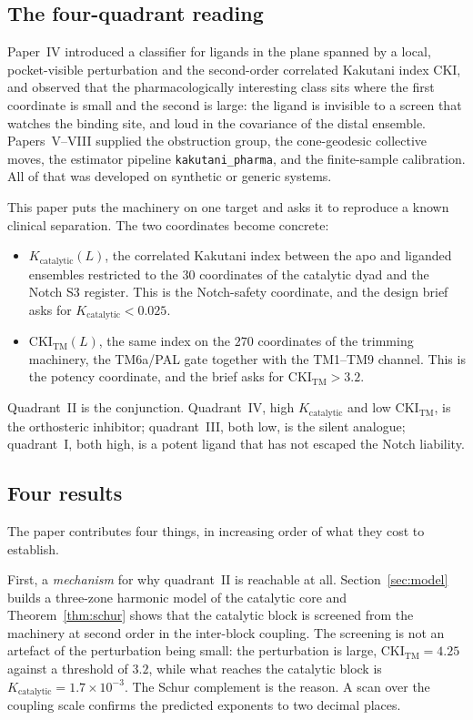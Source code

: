 \documentclass[11pt,reqno]{amsart}
\theoremstyle{plain}
\theoremstyle{definition}
\theoremstyle{remark}
\numberwithin{equation}{section}
\newcommand{\CKI}{\mathrm{CKI}}
\newcommand{\Kcat}{K_{\mathrm{catalytic}}}
\newcommand{\CKItm}{\CKI_{\mathrm{TM}}}
\newcommand{\pkg}{\texttt{kakutani\_pharma}}
\begin{document}
\subsection{The four-quadrant reading}
Paper~IV introduced a classifier for ligands in the plane spanned by a local, pocket-visible perturbation and the second-order correlated Kakutani index $\CKI$, and observed that the pharmacologically interesting class sits where the first coordinate is small and the second is large: the ligand is invisible to a screen that watches the binding site, and loud in the covariance of the distal ensemble. Papers~V--VIII supplied the obstruction group, the cone-geodesic collective moves, the estimator pipeline \pkg{}, and the finite-sample calibration. All of that was developed on synthetic or generic systems.

This paper puts the machinery on one target and asks it to reproduce a known clinical separation. The two coordinates become concrete:
\begin{itemize}[leftmargin=1.6em,itemsep=2pt]
\item $\Kcat(L)$, the correlated Kakutani index between the apo and liganded ensembles restricted to the $30$ coordinates of the catalytic dyad and the Notch S3 register. This is the Notch-safety coordinate, and the design brief asks for $\Kcat<0.025$.
\item $\CKItm(L)$, the same index on the $270$ coordinates of the trimming machinery, the TM6a/PAL gate together with the TM1--TM9 channel. This is the potency coordinate, and the brief asks for $\CKItm>3.2$.
\end{itemize}
Quadrant~II is the conjunction. Quadrant~IV, high $\Kcat$ and low $\CKItm$, is the orthosteric inhibitor; quadrant~III, both low, is the silent analogue; quadrant~I, both high, is a potent ligand that has not escaped the Notch liability.

\subsection{Four results}
The paper contributes four things, in increasing order of what they cost to establish.

First, a \emph{mechanism} for why quadrant~II is reachable at all. Section~\ref{sec:model} builds a three-zone harmonic model of the catalytic core and Theorem~\ref{thm:schur} shows that the catalytic block is screened from the machinery at second order in the inter-block coupling. The screening is not an artefact of the perturbation being small: the perturbation is large, $\CKItm=4.25$ against a threshold of $3.2$, while what reaches the catalytic block is $\Kcat=1.7\times10^{-3}$. The Schur complement is the reason. A scan over the coupling scale confirms the predicted exponents to two decimal places.
\end{document}
